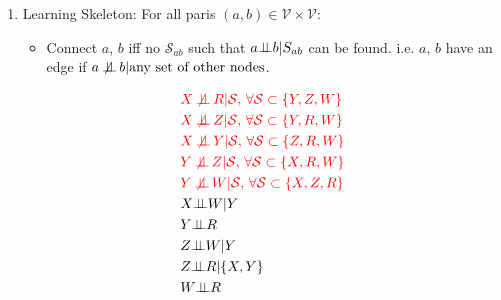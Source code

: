 \begin{enumerate}[topsep=2pt,itemsep=2pt]
    \item Learning Skeleton: For all paris $ (a,b)\in \mathcal{V}\times \mathcal{V} $:
    \begin{itemize}[topsep=2pt,itemsep=0pt]
        \item Connect $ a $, $ b $ iff no $ \mathcal{S}_{ab} $ such that $ a\bot\!\!\!\bot b|S_{ab} $ can be found. i.e. $ a,\,b $ have an edge if $ a\not\!\!\mathop{\bot\!\!\!\bot} b|\text{any set of other nodes} $.
    \end{itemize}
    \begin{center}
        \begin{minipage}{0.4\linewidth}
            \begin{align*}
                &\color{red}X \not\!\!\mathop{\independent} R |\mathcal{S},\,\forall \mathcal{S}\subset\{Y,Z,W\}\\
                &\color{red}X \not\!\!\mathop{\independent} Z |\mathcal{S},\,\forall \mathcal{S}\subset\{Y,R,W\}\\
                &\color{red}X \not\!\!\mathop{\independent} Y |\mathcal{S},\,\forall \mathcal{S}\subset\{Z,R,W\}\\
                &\color{red}Y \not\!\!\mathop{\independent} Z |\mathcal{S},\,\forall \mathcal{S}\subset\{X,R,W\}\\
                &\color{red}Y \not\!\!\mathop{\independent} W |\mathcal{S},\,\forall \mathcal{S}\subset\{X,Z,R\}\\
                &X\independent W|Y\\
                &Y\independent R\\
                &Z\independent W|Y\\
                &Z\independent R|\{X,Y\}\\
                &W\independent R
            \end{align*}
        \end{minipage}
\end{center}
\end{enumerate}

